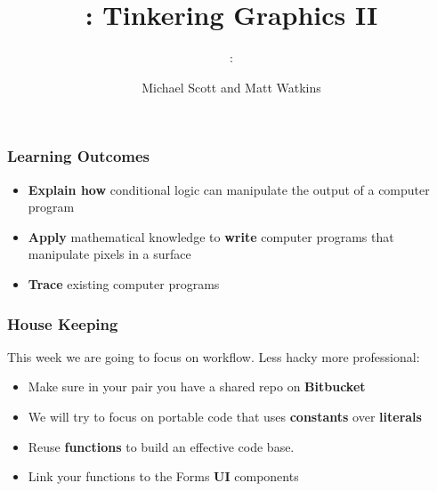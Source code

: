 \usepackage{../../beamerthemeFalmouthGamesAcademy}
\usepackage{multimedia}
\graphicspath{ {../../} }


\usepackage[normalem]{ulem}
\usepackage{wasysym}

\usepackage{pdfpages}

\usetikzlibrary{arrows,automata}

\title{\sessionnumber: Tinkering Graphics II}
\subtitle{\modulecode: \moduletitle}
\author{Michael Scott and Matt Watkins}



{\tiny }


\maketitle

\begin{frame}
	\frametitle{Learning Outcomes}
	\begin{itemize}
		\item \textbf{Explain how} conditional logic can manipulate the output of a computer program
		\item \textbf{Apply} mathematical knowledge to \textbf{write} computer programs that manipulate pixels in a surface
		\item \textbf{Trace} existing computer programs
	\end{itemize}
\end{frame}

\begin{frame}
	\frametitle{House Keeping}
	
	This week we are going to focus on workflow. Less hacky more professional:
	
	\begin{itemize}		
		\item Make sure in your pair you have a shared repo on \textbf{Bitbucket}
		\item We will try to focus on portable code that uses \textbf{constants} over \textbf{literals}
		\item Reuse \textbf{functions} to build an effective code base.
		\item Link your functions to the Forms \textbf{UI} components
	
	\end{itemize}
\end{frame}

